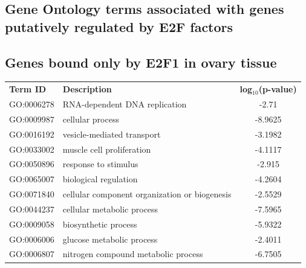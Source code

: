 \documentclass[11pt,twoside,a4paper]{report}
\begin{document}
\cleardoublepage
\begin{appendices}
	\chapter{Gene Ontology terms associated with genes putatively regulated by E2F factors}
	\label{appendix:GOterms}
	
	\section{Genes bound only by E2F1 in ovary tissue}
	\footnotesize  %
	\begin{longtable}{@{\extracolsep{\fill}}llc@{}}
	\textbf{Term ID}  & \textbf{Description}                                            & \textbf{log$_{10}$(p-value)} \\
    GO:0006278 & RNA-dependent DNA replication                                          & -2.71         \\
    GO:0009987 & cellular process                                                       & -8.9625       \\
    GO:0016192 & vesicle-mediated transport                                             & -3.1982       \\
    GO:0033002 & muscle cell proliferation                                              & -4.1117       \\
    GO:0050896 & response to stimulus                                                   & -2.915        \\
    GO:0065007 & biological regulation                                                  & -4.2604       \\
    GO:0071840 & cellular component organization or biogenesis                          & -2.5529       \\
    GO:0044237 & cellular metabolic process                                             & -7.5965       \\
    GO:0009058 & biosynthetic process                                                   & -5.9322       \\
    GO:0006006 & glucose metabolic process                                              & -2.4011       \\
    GO:0006807 & nitrogen compound metabolic process                                    & -6.7505       \\

\end{longtable}
\end{appendices}
\end{document}
